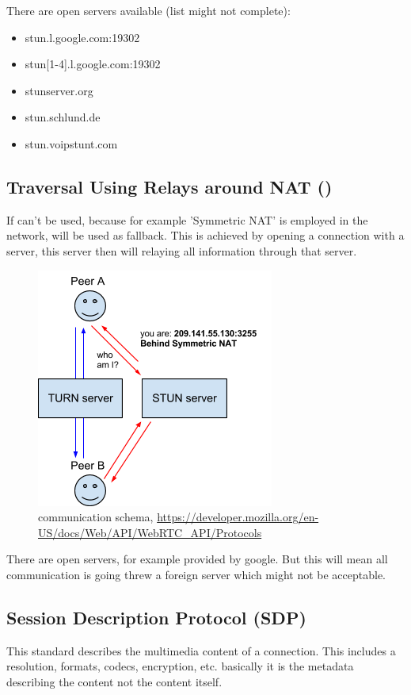 There are open  servers available (list might not complete):
\begin{itemize}
	\item stun.l.google.com:19302
	\item stun[1-4].l.google.com:19302
	\item stunserver.org
	\item stun.schlund.de
	\item stun.voipstunt.com
\end{itemize}

\subsection{Traversal Using Relays around NAT ()}
If  can't be used, because for example 'Symmetric NAT' is employed in the network,  will be used as fallback. This is achieved by opening a connection with a  server, this server then will relaying all information through that server.

\begin{figure}[H]
	\includegraphics[scale=0.5]{images/webrtc-turn.png}
	\centering
	\caption{ communication schema, \url{https://developer.mozilla.org/en-US/docs/Web/API/WebRTC_API/Protocols}}
	\label{fig:TURN}
\end{figure}

There are open  servers, for example provided by google. But this will mean all communication is going threw a foreign server which might not be acceptable.

\subsection{Session Description Protocol (SDP)}
This standard describes the multimedia content of a connection. This includes a resolution, formats, codecs, encryption, etc. basically it is the metadata describing the content not the content itself.

